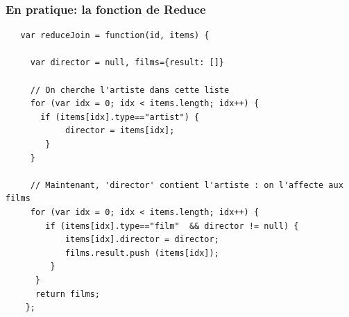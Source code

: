 \begin{frame}[fragile]
\frametitle{En pratique: la fonction de Reduce}

\begin{verbatim}
   var reduceJoin = function(id, items) {
   
     var director = null, films={result: []}
      
     // On cherche l'artiste dans cette liste    
     for (var idx = 0; idx < items.length; idx++) {
       if (items[idx].type=="artist") {
            director = items[idx];
        }
     }             
           
     // Maintenant, 'director' contient l'artiste : on l'affecte aux films   
     for (var idx = 0; idx < items.length; idx++) {
        if (items[idx].type=="film"  && director != null) {
            items[idx].director = director;
            films.result.push (items[idx]);
         }             
      }
      return films; 
    };
\end{verbatim}

\end{frame}
